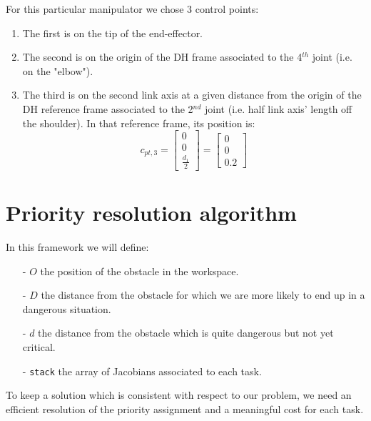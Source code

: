 \documentclass[12pt, a4paper]{article}
\begin{document}
For this particular manipulator we chose 3 control points:
\begin{enumerate}
\item The first is on the tip of the end-effector.
\item The second is on the origin of the DH frame associated to the 4$^{th}$ joint (i.e. on the "elbow").
\item The third is on the second link axis at a given distance from the origin of the DH reference frame associated to the 2$^{nd}$ joint (i.e. half link axis' length off the shoulder). In that reference frame, its position is:
\[c_{pt,3} = \begin{bmatrix}
0\\0\\ \frac{d_1}{2}
\end{bmatrix} = \begin{bmatrix}
0\\0\\ 0.2
\end{bmatrix}
\]
\end{enumerate}

\section{Priority resolution algorithm}
In this framework we will define:
\begin{enumerate}
\item[-] $O$ the position of the obstacle in the workspace.
\item[-] $D$ the distance from the obstacle for which we are more likely to end up in a dangerous situation.
\item[-] $d$ the distance from the obstacle which is quite dangerous but not yet critical.
\item[-] \texttt{stack} the array of Jacobians associated to each task.
\end{enumerate}
To keep a solution which is consistent with respect to our problem, we need an efficient resolution of the priority assignment and a meaningful cost for each task.
\end{document}

